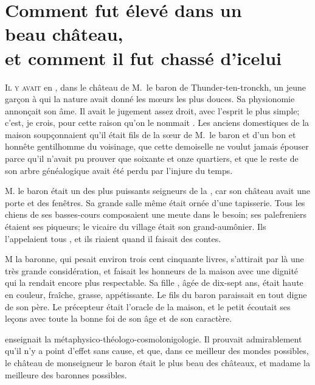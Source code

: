 \chapter[Comment \bname{Candide} fut élevé…]
{Comment  fut élevé dans un\\ beau château,\\ et comment il fut
chassé d’icelui}


\lettrine{I}{l y avait} en , dans le château de M.~le baron de
Thunder-ten-tronckh, un jeune garçon à qui la nature avait donné les
mœurs les plus douces. Sa physionomie annonçait son âme. Il avait le
jugement assez droit, avec l’esprit le plus simple; c’est, je crois,
pour cette raison qu’on le nommait . Les anciens domestiques de
la maison soupçonnaient qu’il était fils de la sœur de M.~le
baron et d’un bon et honnête gentilhomme du voisinage, que cette
demoiselle ne voulut jamais épouser parce qu’il n’avait pu prouver que
soixante et onze quartiers, et que le reste de son arbre généalogique
avait été perdu par l’injure du temps.

M. le baron était un des plus puissants seigneurs de la
, car son château avait une porte et des fenêtres. Sa grande
salle même était ornée d’une tapisserie. Tous les chiens de ses
basses-cours composaient une meute dans le besoin; ses palefreniers
étaient ses piqueurs; le vicaire du village était son grand-aumônier.
Ils l’appelaient tous , et ils riaient quand il faisait des
contes.

M la baronne, qui pesait environ trois cent cinquante livres,
s’attirait par là une très grande considération, et faisait les honneurs
de la maison avec une dignité qui la rendait encore plus respectable.
Sa fille , âgée de dix-sept ans, était haute en couleur,
fraîche, grasse, appétissante. Le fils du baron paraissait en tout
digne de son père. Le précepteur  était l’oracle de la
maison, et le petit  écoutait ses leçons avec toute la bonne foi
de son âge et de son caractère.




 enseignait la métaphysico-théologo-cosmo\-lo\-ni\-go\-logie. Il
prouvait admirablement qu’il n’y a point d’effet sans cause, et que,
dans ce meilleur des mondes possibles, le château de monseigneur le
baron était le plus beau des châteaux, et madame la meilleure des
baronnes possibles.



